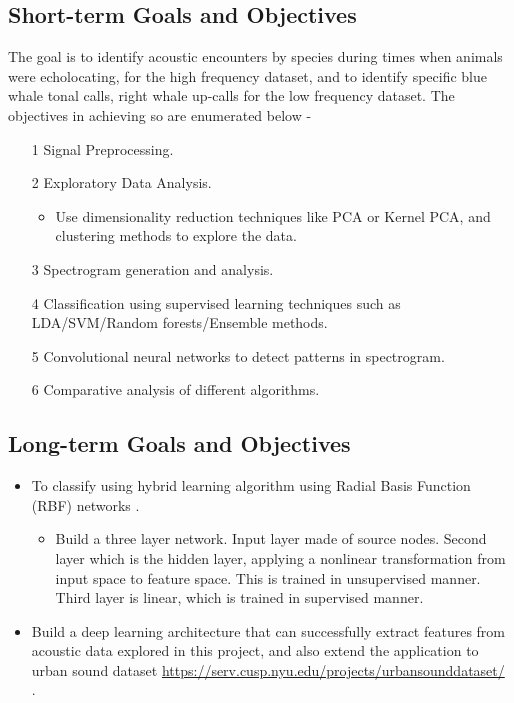 \documentclass[final]{article}
\begin{document}
\subsection{Short-term Goals and Objectives}
The goal is to identify acoustic encounters by species during times when animals were echolocating, for the high frequency dataset, and to identify specific blue whale tonal calls, right whale up-calls for the low frequency dataset. The objectives in achieving so are enumerated below -
\begin{itemize}
\item[1] Signal Preprocessing.
\item[2] Exploratory Data Analysis.
\begin{itemize} 
\item Use dimensionality reduction techniques like PCA or Kernel PCA, and clustering methods to explore the data. 
\end{itemize}
\item[3] Spectrogram generation and analysis. 
\item[4] Classification using supervised learning techniques such as LDA/SVM/Random forests/Ensemble methods.
\item[5] Convolutional neural networks to detect patterns in spectrogram.
\item[6] Comparative analysis of different algorithms.
\end{itemize}

\subsection{Long-term Goals and Objectives}
\begin{itemize}
\item To classify using hybrid learning algorithm using Radial Basis Function (RBF) networks \citep{haykin2009neural}. 
\begin{itemize}
\item Build a three layer network. Input layer made of source nodes. Second layer which is the hidden layer, applying a nonlinear transformation from input space to feature space. This is trained in unsupervised manner. Third layer is linear, which is trained in supervised manner.
\end{itemize}
\item Build a deep learning architecture that can successfully extract features from acoustic data explored in this project, and also extend the application to urban sound dataset \url{https://serv.cusp.nyu.edu/projects/urbansounddataset/} \citep{salamon2015unsupervised}.
\end{itemize}
\end{document}
